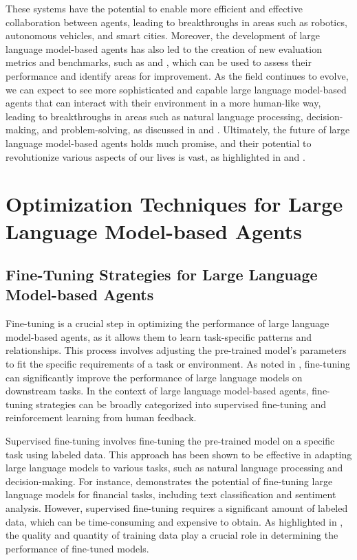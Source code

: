 \documentclass[11pt,a4paper]{article}
\begin{document}
These systems have the potential to enable more efficient and effective collaboration between agents, leading to breakthroughs in areas such as robotics, autonomous vehicles, and smart cities. Moreover, the development of large language model-based agents has also led to the creation of new evaluation metrics and benchmarks, such as \cite{arxiv:2308.03688} and \cite{arxiv:2410.13825}, which can be used to assess their performance and identify areas for improvement. As the field continues to evolve, we can expect to see more sophisticated and capable large language model-based agents that can interact with their environment in a more human-like way, leading to breakthroughs in areas such as natural language processing, decision-making, and problem-solving, as discussed in \cite{arxiv:2402.12914} and \cite{doi:10.1145/3748302}. Ultimately, the future of large language model-based agents holds much promise, and their potential to revolutionize various aspects of our lives is vast, as highlighted in \cite{doi:10.1109/mnet.2025.3539338} and \cite{doi:10.1109/mnet.2024.3435752}.


\section{Optimization Techniques for Large Language Model-based Agents}



\subsection{Fine-Tuning Strategies for Large Language Model-based Agents}


Fine-tuning is a crucial step in optimizing the performance of large language model-based agents, as it allows them to learn task-specific patterns and relationships. This process involves adjusting the pre-trained model's parameters to fit the specific requirements of a task or environment. As noted in \cite{doi:10.1145/3641289}, fine-tuning can significantly improve the performance of large language models on downstream tasks. In the context of large language model-based agents, fine-tuning strategies can be broadly categorized into supervised fine-tuning and reinforcement learning from human feedback.

Supervised fine-tuning involves fine-tuning the pre-trained model on a specific task using labeled data. This approach has been shown to be effective in adapting large language models to various tasks, such as natural language processing and decision-making. For instance, \cite{doi:10.1145/3604237.3626869} demonstrates the potential of fine-tuning large language models for financial tasks, including text classification and sentiment analysis. However, supervised fine-tuning requires a significant amount of labeled data, which can be time-consuming and expensive to obtain. As highlighted in \cite{doi:10.1145/3649506}, the quality and quantity of training data play a crucial role in determining the performance of fine-tuned models.
\end{document}
